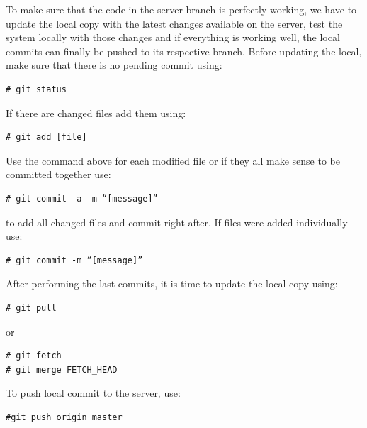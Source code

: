 \documentclass[envcountsame,envcountchap]{svmono}
\begin{document}
To make sure that the code in the server branch is perfectly working, we have to update the local copy with the latest changes available on the server, test the system locally with those changes and if everything is working well, the local commits can finally be pushed to its respective branch. Before updating the local, make sure that there is no pending commit using:
\begin{verbatim}
# git status
\end{verbatim}
If there are changed files add them using:
\begin{verbatim}
# git add [file]
\end{verbatim}
Use the command above for each modified file or if they all make sense to be committed together use:
\begin{verbatim}
# git commit -a -m “[message]”
\end{verbatim}
to add all changed files and commit right after. If files were added individually use:
\begin{verbatim}
# git commit -m “[message]”
\end{verbatim}
After performing the last commits, it is time to update the local copy using:
\begin{verbatim}
# git pull
\end{verbatim}
or
\begin{verbatim}
# git fetch
# git merge FETCH_HEAD
\end{verbatim}

To push local commit to the server, use:

\begin{verbatim}
#git push origin master
\end{verbatim}

\backmatter

\printindex
\end{document}
